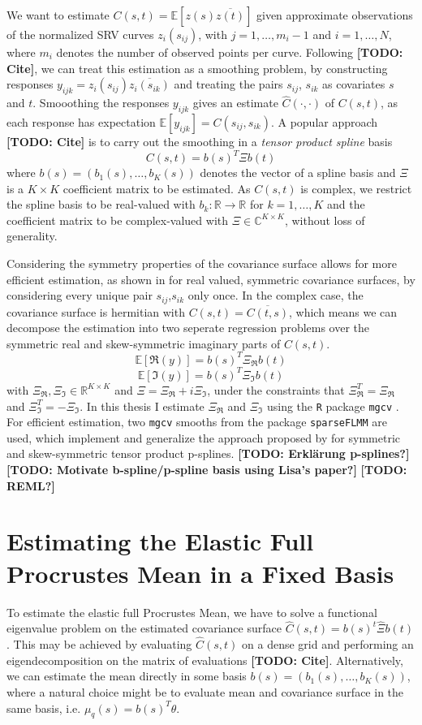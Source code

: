 We want to estimate $C(s,t) = \mathbb{E}[z(s)\overline{z(t)}]$ given approximate observations of the normalized SRV curves $z_i(s_{ij})$, with $j = 1,\dots,m_i-1$ and $i=1,\dots,N$, where $m_i$ denotes the number of observed points per curve.
Following \textbf{[TODO: Cite]}, we can treat this estimation as a smoothing problem, by constructing responses $y_{ijk} = z_i(s_{ij}) \overline{z_i(s_{ik})}$ and treating the pairs $s_{ij}$, $s_{ik}$ as covariates $s$ and $t$.
Smooothing the responses $y_{ijk}$ gives an estimate $\hat C(\cdot, \cdot)$ of $C(s,t)$, as each response has expectation $\mathbb{E}[y_{ijk}] = C(s_{ij},s_{ik})$. 
A popular approach \textbf{[TODO: Cite]} is to carry out the smoothing in a \emph{tensor product spline} basis 
$$ C(s,t) = b(s)^T \Xi b(t) $$
where $b(s) = (b_1(s),\dots,b_K(s))$ denotes the vector of a spline basis and $\Xi$ is a $K \times K$ coefficient matrix to be estimated.
As $C(s,t)$ is complex, we restrict the spline basis to be real-valued with $b_k : \mathbb{R} \rightarrow \mathbb{R}$ for $k = 1,\dots,K$ and the coefficient matrix to be complex-valued with $\Xi \in \mathbb{C}^{K \times K}$, without loss of generality.


Considering the symmetry properties of the covariance surface allows for more efficient estimation, as shown in \cite{CederbaumScheiplGreven2018} for real valued, symmetric covariance surfaces, by considering every unique pair $s_{ij}$,$s_{ik}$ only once.
In the complex case, the covariance surface is hermitian with $C(s,t) = \overline{C(t,s)}$, which means we can decompose the estimation into two seperate regression problems over the symmetric real and skew-symmetric imaginary parts of $C(s,t)$.
$$\mathbb{E}[\Re(y)] = b(s)^T \Xi_{\Re} b(t)$$
$$\mathbb{E}[\Im(y)] = b(s)^T \Xi_{\Im} b(t)$$
with $\Xi_\Re, \Xi_\Im \in \mathbb{R}^{K\times K}$ and $\Xi = \Xi_\Re + i \Xi_\Im$, under the constraints that $\Xi_\Re^T = \Xi_\Re$ and $\Xi_\Im^T = - \Xi_\Im$.
In this thesis I estimate $\Xi_\Re$ and $\Xi_\Im$ using the \texttt{R} \parencite{Rcore} package \texttt{mgcv} \parencite{Wood2017}.
For efficient estimation, two \texttt{mgcv} smooths from the package \texttt{sparseFLMM} \parencite{sparseFLMM} are used, which implement and generalize the approach proposed by \cite{CederbaumScheiplGreven2018} for symmetric and skew-symmetric tensor product p-splines.
\textbf{[TODO: Erklärung p-splines?]}
\textbf{[TODO: Motivate b-spline/p-spline basis using Lisa's paper?]}
\textbf{[TODO: REML?]}


\section{Estimating the Elastic Full Procrustes Mean in a Fixed Basis}
\label{sec:3-mean}
To estimate the elastic full Procrustes Mean, we have to solve a functional eigenvalue problem on the estimated covariance surface $\hat{C}(s,t) = b(s)^t \hat\Xi b(t)$.
This may be achieved by evaluating $\hat{C}(s,t)$ on a dense grid and performing an eigendecomposition on the matrix of evaluations \textbf{[TODO: Cite]}.
Alternatively, we can estimate the mean directly in some basis $b(s) = (b_1(s),\dots,b_K(s))$, where a natural choice might be to evaluate mean and covariance surface in the same basis, i.e. $\mu_q(s) = b(s)^T \theta$.

